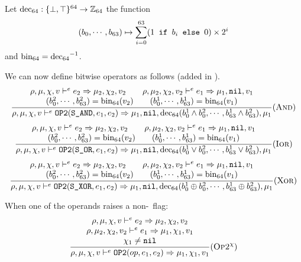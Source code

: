 Let \(\operatorname{dec_{64}}: \{ \bot, \top \}^{64} \to \mathbb{Z}_{64}\) the function
\[(b_0, \cdots, b_{63}) \mapsto \sum_{i=0}^{63} (1\texttt{ if } b_i\texttt{ else }0)\times 2^i\]
and \(\operatorname{bin_{64}} = \operatorname{dec_{64}}^{-1}\).

We can now define bitwise operators as follows (added in \Cmp).\\
\[\dfrac{\begin{array}{c}
    \rho,\mu,\chi,v \vdash^e e_2\Rightarrow \mu_2,\chi_2,v_2 \qquad \rho,\mu_2,\chi_2,v_2\vdash^e e_1\Rightarrow \mu_1,\texttt{nil},v_1 \\
    (b_0^2,\cdots,b_{63}^2) = \operatorname{bin_{64}}(v_2) \qquad (b_0^1,\cdots,b_{63}^1) = \operatorname{bin_{64}}(v_1)
\end{array}}{\rho,\mu,\chi,v \vdash^e \texttt{OP2}(\texttt{S\_AND}, e_1, e_2) \Rightarrow \mu_1,\texttt{nil},\operatorname{dec_{64}}(b_0^1 \wedge b_0^2,\cdots, b_{63}^1 \wedge b_{63}^2),\mu_1} (\textsc{And})\]
\[\dfrac{\begin{array}{c}
    \rho,\mu,\chi,v \vdash^e e_2\Rightarrow \mu_2,\chi_2,v_2 \qquad \rho,\mu_2,\chi_2,v_2\vdash^e e_1\Rightarrow \mu_1,\texttt{nil},v_1 \\
    (b_0^2,\cdots,b_{63}^2) = \operatorname{bin_{64}}(v_2) \qquad (b_0^1,\cdots,b_{63}^1) = \operatorname{bin_{64}}(v_1)
\end{array}}{\rho,\mu,\chi,v \vdash^e \texttt{OP2}(\texttt{S\_OR}, e_1, e_2) \Rightarrow \mu_1,\texttt{nil},\operatorname{dec_{64}}(b_0^1 \vee b_0^2,\cdots, b_{63}^1 \vee b_{63}^2),\mu_1} (\textsc{Ior})\]
\[\dfrac{\begin{array}{c}
    \rho,\mu,\chi,v \vdash^e e_2\Rightarrow \mu_2,\chi_2,v_2 \qquad \rho,\mu_2,\chi_2,v_2\vdash^e e_1\Rightarrow \mu_1,\texttt{nil},v_1 \\
    (b_0^2,\cdots,b_{63}^2) = \operatorname{bin_{64}}(v_2) \qquad (b_0^1,\cdots,b_{63}^1) = \operatorname{bin_{64}}(v_1)
\end{array}}{\rho,\mu,\chi,v \vdash^e \texttt{OP2}(\texttt{S\_XOR}, e_1, e_2) \Rightarrow \mu_1,\texttt{nil},\operatorname{dec_{64}}(b_0^1 \oplus b_0^2,\cdots, b_{63}^1 \oplus b_{63}^2),\mu_1} (\textsc{Xor})\]

When one of the operands raises a non-\nil\ flag:
\[\dfrac{\begin{array}{c}
    \rho,\mu,\chi,v \vdash^e e_2\Rightarrow \mu_2,\chi_2,v_2 \\
    \rho,\mu_2,\chi_2,v_2 \vdash^e e_1\Rightarrow \mu_1,\chi_1,v_1 \\
    \chi_1\ne\texttt{nil}
\end{array}}{\rho,\mu,\chi,v \vdash^e \texttt{OP2}(op, e_1, e_2) \Rightarrow \mu_1,\chi_1,v_1} (\textsc{Op2}^\chi)\]

